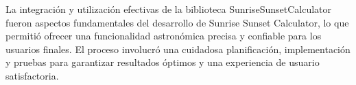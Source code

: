 \documentclass[conference]{IEEEtran}
\begin{document}
La integración y utilización efectivas de la biblioteca SunriseSunsetCalculator fueron aspectos fundamentales del desarrollo de Sunrise Sunset Calculator, lo que permitió ofrecer una funcionalidad astronómica precisa y confiable para los usuarios finales. El proceso involucró una cuidadosa planificación, implementación y pruebas para garantizar resultados óptimos y una experiencia de usuario satisfactoria.
%
%
% 
\begin{figure}
\\

\end{figure}
\end{document}
